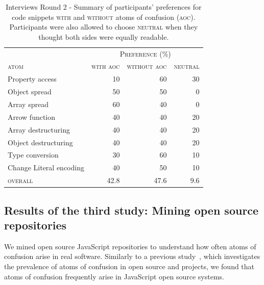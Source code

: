 \begin{table}[!htb]
    \centering
    \caption{Interviews Round 2 - Summary of participants' preferences for code snippets \textsc{with} and \textsc{without} atoms of confusion (\textsc{aoc}). Participants were also allowed to choose \textsc{neutral} when they thought both sides were equally readable.}
    \label{tab:interview-results2}
    \begin{tabular}{lrrr}\toprule
      & \multicolumn{3}{c}{\textsc{Preference (\%)}} \\
      \cmidrule(lr){2-4}
         \textsc{atom}           & \multicolumn{1}{c}{\textsc{with aoc}}
                                      &  \multicolumn{1}{c}{\textsc{without aoc}}
                                               & \multicolumn{1}{c}{\textsc{neutral}} \\ \midrule
         Property access         & 10  & 60  & 30  \\
         Object spread           & 50 & 50     & 0    \\
         Array spread            & 60  & 40    & 0     \\
         Arrow function          & 40 & 40     & 20  \\
         Array destructuring     & 40 & 40  & 20  \\
         Object destructuring    & 40 & 40     & 20    \\
         Type conversion         & 30  & 60    & 10     \\
         Change Literal encoding & 40 & 50  & 10  \\ \midrule
         \textsc{overall}        & 42.8 & 47.6  & 9.6  \\
         \bottomrule
    \end{tabular}
\end{table}

\subsection{Results of the third study: Mining open source repositories}
\label{sec:msr-results} 

We mined \minedprojects open source JavaScript repositories to understand how often atoms of confusion arise in real software. Similarly to a previous study~\cite{DBLP:conf/msr/GopsteinZFC18}, which investigates the prevalence of atoms of confusion in open source \clang and \cpplang projects, we found that atoms of confusion frequently arise in JavaScript open source systems. 

